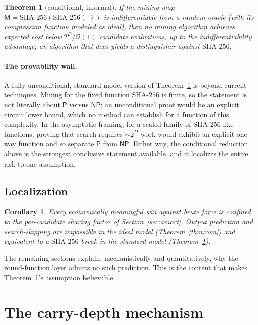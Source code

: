 \documentclass[11pt]{article}
\newtheorem{theorem}{Theorem}
\newtheorem{corollary}{Corollary}
\theoremstyle{remark}
\newcommand{\Mhash}{\mathsf{M}}
\newcommand{\SHA}{\mathrm{SHA\text{-}256}}
\newcommand{\bigO}{\mathcal{O}}
\begin{document}
\begin{theorem}[conditional, informal]\label{thm:reduction}
If the mining map $\Mhash=\SHA(\SHA(\cdot))$ is indifferentiable from a
random oracle (with its compression function modeled as ideal), then no
mining algorithm achieves expected cost below $2^{D}/\bigO(1)$ candidate
evaluations, up to the indifferentiability advantage; an algorithm that
does yields a distinguisher against $\SHA$.
\end{theorem}

\paragraph{The provability wall.}
A fully unconditional, standard-model version of
Theorem~\ref{thm:reduction} is beyond current techniques. Mining for the
fixed function $\SHA$ is finite, so the statement is not literally about
$\mathsf{P}$ versus $\mathsf{NP}$; an unconditional proof would be an
explicit circuit lower bound, which no method can establish for a
function of this complexity. In the asymptotic framing, for a scaled
family of $\SHA$-like functions, proving that search requires
$\sim 2^{D}$ work would exhibit an explicit one-way function and so
separate $\mathsf{P}$ from $\mathsf{NP}$. Either way, the conditional
reduction above is the strongest conclusive statement available, and it
localizes the entire risk to one assumption.

\subsection{Localization}\label{sec:localization}

\begin{corollary}\label{cor:localization}
Every economically meaningful win against brute force is confined to the
per-candidate sharing factor of Section~\ref{sec:amort}. Output
prediction and search-skipping are impossible in the ideal model
(Theorem~\ref{thm:rom}) and equivalent to a $\SHA$ break in the standard
model (Theorem~\ref{thm:reduction}).
\end{corollary}

The remaining sections explain, mechanistically and quantitatively, why
the round-function layer admits no such prediction. This is the content
that makes Theorem~\ref{thm:reduction}'s assumption believable.

\section{The carry-depth mechanism}\label{sec:carry}
\end{document}
